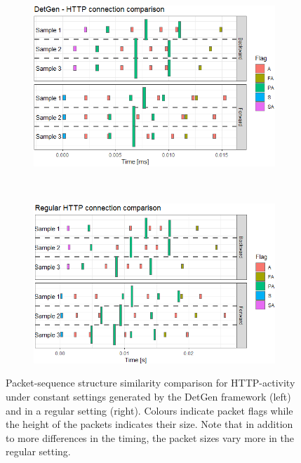 \documentclass{article}
\begin{document}
\begin{figure}
\centering
\begin{subfigure}[b]{0.47\textwidth}
\includegraphics[width=\textwidth]{images/DetGen_HTTP_comp_crop.png}
\end{subfigure}
~
\begin{subfigure}[b]{0.47\textwidth}
\includegraphics[width=\textwidth]{images/Reg_HTTP_comp_crop.png}
\end{subfigure}
\caption{Packet-sequence structure similarity comparison for HTTP-activity under constant settings generated by the DetGen framework (left) and in a regular setting (right). Colours indicate packet flags while the height of the packets indicates their size. Note that in addition to more differences in the timing, the packet sizes vary more in the regular setting. }
\end{figure}
\end{document}
